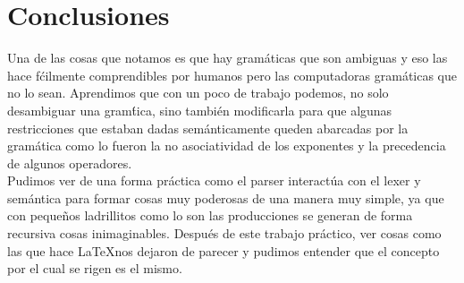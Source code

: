 \section{Conclusiones}
Una de las cosas que notamos es que hay gram\'aticas que son ambiguas y eso las hace f\'cilmente comprendibles
por humanos pero las computadoras  gram\'aticas que no lo sean. Aprendimos que con un poco de trabajo
podemos, no solo desambiguar una gram\'tica, sino tambi\'en modificarla para que algunas restricciones que estaban dadas sem\'anticamente
queden abarcadas por la gram\'atica como lo fueron la no asociatividad de los exponentes y la precedencia de algunos operadores. \\

Pudimos ver de una forma pr\'actica como el parser interact\'ua con el lexer y sem\'antica para formar cosas muy poderosas de una
manera muy simple, ya que con peque\~nos ladrillitos como lo son las producciones se generan de forma recursiva cosas inimaginables.
Despu\'es de este trabajo pr\'actico, ver cosas como las que hace \LaTeX nos dejaron de parecer  y pudimos entender
que el concepto por el cual se rigen es el mismo. \\